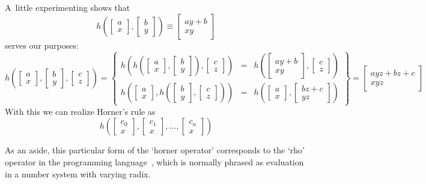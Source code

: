 A~little experimenting shows that
\newcommand\xyvec[2]{
  \left[
  \begin{array}{c}
    #1\\#2
  \end{array}
  \right]
}
\[
 h\left( \xyvec ax,\xyvec by \right) \equiv \xyvec {ay+b}{xy} 
\]
serves our purposes:
\[
  h\left( \xyvec ax,\xyvec by ,\xyvec cz \right)
  = \left\{
    \begin{array}{lll}
      h\left( h\left( \xyvec ax,\xyvec by \right ),\xyvec cz \right)
      &=&
      h\left( \xyvec {ay+b}{xy},\xyvec cz \right)
      \\
      h\left( \xyvec ax,h\left( \xyvec by ,\xyvec cz \right ) \right)
      &=&
      h\left( \xyvec ax,\xyvec { bz+c } {yz} \right)
    \end{array}
  \right\} = \xyvec{ayz + bz +c}{xyz}
\]
With this we can realize Horner's rule as
\[ h\left( \xyvec {c_0}x,\xyvec {c_1}x,\ldots,\xyvec {c_n}x \right) \]

As an aside, this particular form of the `horner operator'
corresponds to the `rho' operator in the programming language~,
which is normally phrased as evaluation in a number system
with varying radix.
